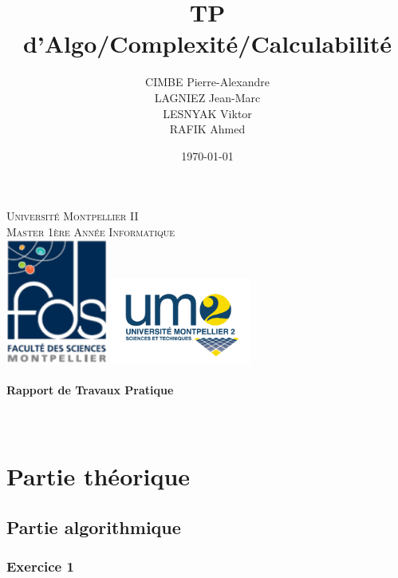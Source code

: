 \documentclass[]{article}
\title{TP d'Algo/Complexité/Calculabilité}
\author{
  CIMBE Pierre-Alexandre \\
  LAGNIEZ Jean-Marc \\
  LESNYAK Viktor \\
  RAFIK Ahmed}
\date\today
\begin{document}
\makeatletter
  \begin{titlepage}
    \centering
        {\large \textsc{Université Montpellier II}}\\
        \textsc{Master 1ère Année Informatique}\\
        \vspace{1cm}
        \includegraphics[width=0.25\textwidth]{logo.png}
        \hfill
        \includegraphics[width=0.35\textwidth]{logo2.png}\\
        \vspace{1cm}
               {\large\textbf{	\@date\\
                   Rapport de Travaux Pratique}}\\
               \vfill
                   {\LARGE \textbf{\@title}} \\
                   \vspace{2em}
                          {\large \@author} \\
                          \vfill
  \end{titlepage}
\makeatother


\section{Partie théorique}
\subsection{Partie algorithmique}

\subsubsection{Exercice 1}
\end{document}
